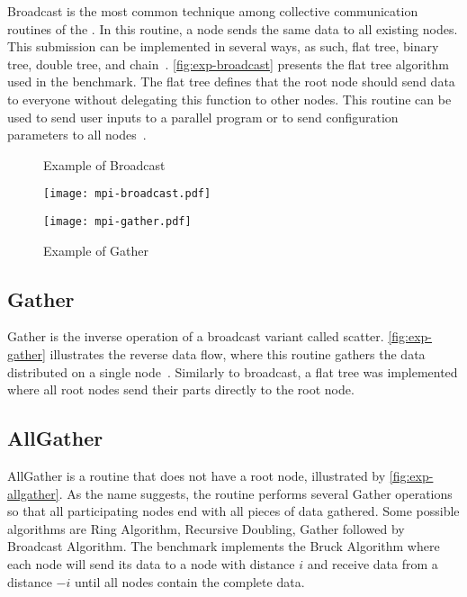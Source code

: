 			Broadcast is the most common technique among collective communication
			routines of the \mpi. In this routine, a node sends the same data to
			all existing nodes. This submission can be implemented in several ways,
			as such, flat tree, binary tree, double tree, and chain~\cite{mpi-survey}.
			\autoref{fig:exp-broadcast} presents the flat tree algorithm used in
			the benchmark. The flat tree defines that the root node should send
			data to everyone without delegating this function to other nodes.
			This routine can be used to send user inputs to a parallel program
			or to send configuration parameters to all nodes~\cite{url:mpitutorial}.

			\begin{figure}[!tb]
				\centering

				\begin{minipage}{.4\textwidth}
					\centering%
					\caption{Example of \mpi Broadcast}%
					\label{fig:exp-broadcast}%
					\texttt{[image: mpi-broadcast.pdf]}%
				\end{minipage}%
				\hfill%
				\begin{minipage}{.4\textwidth}
					\centering%
					\caption{Example of \mpi Gather}%
					\label{fig:exp-gather}%
					\texttt{[image: mpi-gather.pdf]}%
				\end{minipage}%

			\end{figure}

		\subsection{Gather}

			Gather is the inverse operation of a broadcast variant called scatter.
			\autoref{fig:exp-gather} illustrates the reverse data flow, where this
			routine gathers the data distributed on a single node~\cite{url:mpitutorial}.
			Similarly to broadcast, a flat tree was implemented where all root
			nodes send their parts directly to the root node.

		\subsection{AllGather}

			AllGather is a routine that does not have a root node, illustrated by
			\autoref{fig:exp-allgather}. As the name suggests, the routine performs
			several Gather operations so that all participating nodes end with all
			pieces of data gathered. Some possible algorithms are Ring Algorithm,
			Recursive Doubling, Gather followed by Broadcast Algorithm. The benchmark
			implements the Bruck Algorithm where each node will send its data to a node
			with distance $i$ and receive data from a distance $-i$ until all nodes
			contain the complete data.
			
